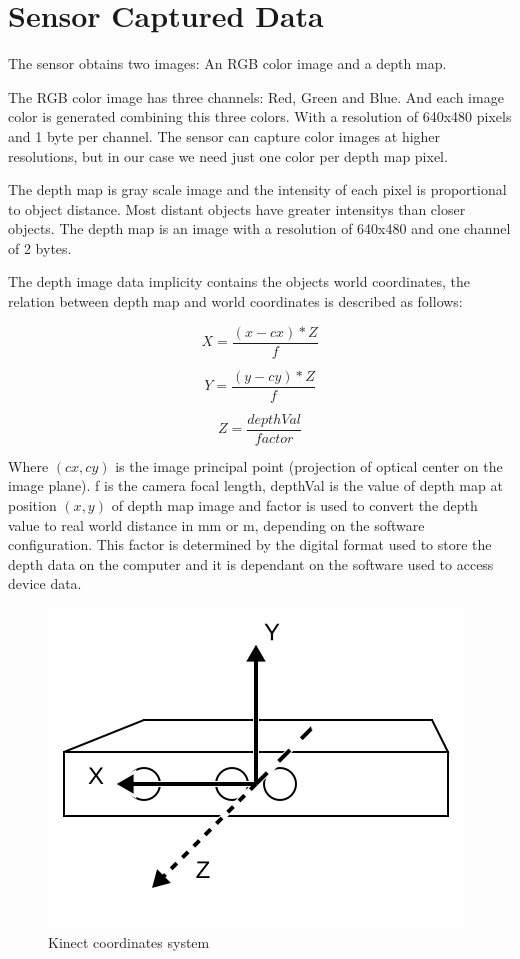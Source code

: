 \section{Sensor Captured Data}

The sensor obtains two images: An RGB color image and a depth map.

The RGB color image has three channels: Red, Green and Blue. And each image color is generated 
combining this three colors. With a resolution of 640x480 pixels and 1 byte per channel. The sensor can 
capture color images at higher resolutions, but in our case we need just one color per depth map pixel.


The depth map is gray scale image and the intensity of each pixel is proportional to object distance. 
Most distant objects have greater intensitys than closer objects. The depth map is an image with a resolution of 
640x480 and one channel of 2 bytes.

The depth image data implicity contains the objects world coordinates, the relation between depth map 
and world coordinates is described as follows:

\begin{equation}
\label{eq:disparity2}
 X=\frac{(x-cx)*Z}{f}
\end{equation}

\begin{equation}
\label{eq:disparity2}
 Y=\frac{(y-cy)*Z}{f}
\end{equation}

\begin{equation}
\label{eq:disparity2}
 Z=\frac{depthVal}{factor}
\end{equation}

Where $(cx,cy)$ is the image principal point (projection of optical center on the image plane). f is the camera 
focal length, depthVal is the value of depth map at position $(x,y)$ of depth map image and factor is used to convert 
the depth value to real world distance in mm or m, depending on the software configuration. This factor is determined by 
the digital format used to store the depth data on the 
computer and it is dependant on the software used to access device data.

\begin{figure}[h!]
\begin{center}
\includegraphics[scale=1]{images/coordinates}
\caption{Kinect coordinates system}
\label{fig:coordinates}
\end{center}
\end{figure}


